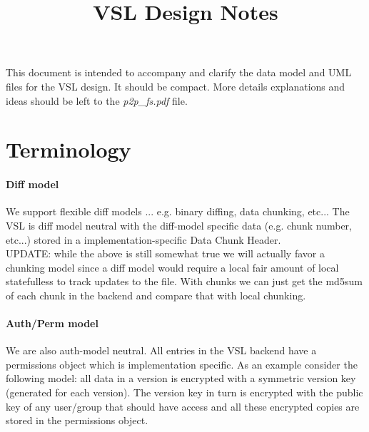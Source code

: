 \documentclass[10pt]{article}
\begin{document}
\title{VSL Design Notes}
\author{}
\maketitle



%
%


%
%

\tableofcontents
\newpage

This document is intended to accompany and clarify the data model and UML files for the VSL design.  It should be compact.  More details explanations and ideas should be left to the {\em p2p\_fs.pdf} file.

\section{Terminology}

\paragraph{Diff model} 

We support flexible diff models ... e.g. binary diffing, data chunking, etc...
The VSL is diff model neutral with the diff-model specific data (e.g. chunk
number, etc...) stored in a implementation-specific Data Chunk Header.\\
UPDATE: while the above is still somewhat true we will actually favor a chunking
model since a diff model would require a local fair amount of local statefulless
to track updates to the file.  With chunks we can just get the md5sum of each
chunk in the backend and compare that with local chunking.

\paragraph{Auth/Perm model}

We are also auth-model neutral.  All entries in the VSL backend have a permissions object which is implementation specific.  As an example consider the following model:  all data in a version is encrypted with a symmetric version key (generated for each version).  The version key in turn is encrypted with the public key of any user/group that should have access and all these encrypted copies are stored in the permissions object.  
\end{document}
